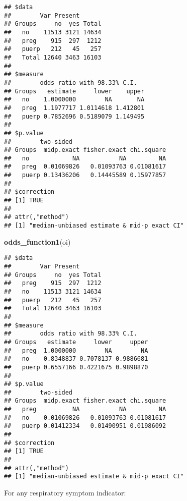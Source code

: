 \documentclass[
]{article}
\newenvironment{Shaded}{\begin{snugshade}}{\end{snugshade}}
\newcommand{\DataTypeTok}[1]{\textcolor[rgb]{0.13,0.29,0.53}{#1}}
\newcommand{\KeywordTok}[1]{\textcolor[rgb]{0.13,0.29,0.53}{\textbf{#1}}}
\newcommand{\NormalTok}[1]{#1}
\newcommand{\OperatorTok}[1]{\textcolor[rgb]{0.81,0.36,0.00}{\textbf{#1}}}
\newcommand{\OtherTok}[1]{\textcolor[rgb]{0.56,0.35,0.01}{#1}}
\newcommand{\StringTok}[1]{\textcolor[rgb]{0.31,0.60,0.02}{#1}}
\begin{document}
\begin{verbatim}
## $data
##        Var Present
## Groups     no  yes Total
##   no    11513 3121 14634
##   preg    915  297  1212
##   puerp   212   45   257
##   Total 12640 3463 16103
## 
## $measure
##        odds ratio with 98.33% C.I.
## Groups   estimate     lower    upper
##   no    1.0000000        NA       NA
##   preg  1.1977717 1.0114618 1.412801
##   puerp 0.7852696 0.5189079 1.149495
## 
## $p.value
##        two-sided
## Groups  midp.exact fisher.exact chi.square
##   no            NA           NA         NA
##   preg  0.01069826   0.01093763 0.01081617
##   puerp 0.13436206   0.14445589 0.15977857
## 
## $correction
## [1] TRUE
## 
## attr(,"method")
## [1] "median-unbiased estimate & mid-p exact CI"
\end{verbatim}

\begin{Shaded}
\begin{Highlighting}[]
\KeywordTok{odds_function1}\NormalTok{(oi)}
\end{Highlighting}
\end{Shaded}

\begin{verbatim}
## $data
##        Var Present
## Groups     no  yes Total
##   preg    915  297  1212
##   no    11513 3121 14634
##   puerp   212   45   257
##   Total 12640 3463 16103
## 
## $measure
##        odds ratio with 98.33% C.I.
## Groups   estimate     lower     upper
##   preg  1.0000000        NA        NA
##   no    0.8348837 0.7078137 0.9886681
##   puerp 0.6557166 0.4221675 0.9898870
## 
## $p.value
##        two-sided
## Groups  midp.exact fisher.exact chi.square
##   preg          NA           NA         NA
##   no    0.01069826   0.01093763 0.01081617
##   puerp 0.01412334   0.01490951 0.01986092
## 
## $correction
## [1] TRUE
## 
## attr(,"method")
## [1] "median-unbiased estimate & mid-p exact CI"
\end{verbatim}

For any respiratory symptom indicator:

\begin{Shaded}
\end{Shaded}
\end{document}
